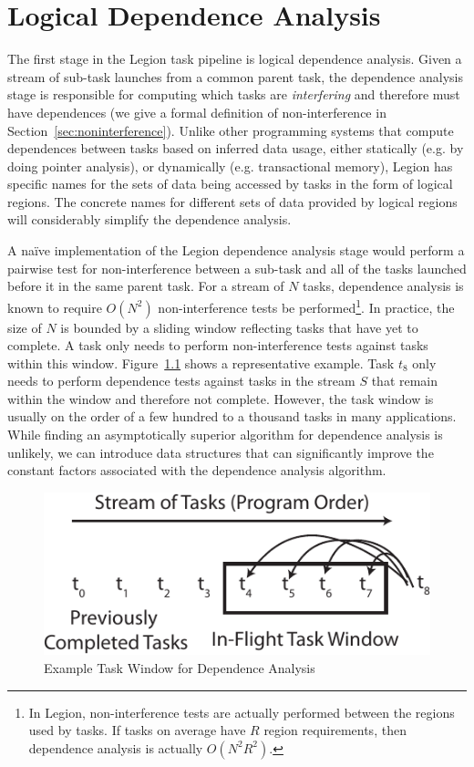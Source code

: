 

\chapter{Logical Dependence Analysis}
\label{chapter:logical}
The first stage in the Legion task pipeline
is logical dependence analysis. Given a stream
of sub-task launches from a common parent task, the 
dependence analysis stage is responsible for computing which 
tasks are {\em interfering} and therefore must have 
dependences (we give a formal definition of non-interference 
in Section~\ref{sec:noninterference}). Unlike other 
programming systems that compute dependences between 
tasks based on inferred data usage, either statically (e.g. 
by doing pointer analysis), or dynamically (e.g. transactional 
memory), Legion has specific names for the 
sets of data being accessed by tasks in the form 
of logical regions. The concrete names for different
sets of data provided by logical regions will
considerably simplify the dependence analysis.

A na\"{i}ve implementation of the Legion dependence 
analysis stage would perform a pairwise test for
non-interference between a sub-task and all of the
tasks launched before it in the same parent task.
For a stream of $N$ tasks, dependence analysis is 
known to require $O(N^2)$ non-interference tests
be performed\footnote{In Legion, non-interference
tests are actually performed between the regions
used by tasks. If tasks on average have $R$ region
requirements, then dependence analysis is actually
$O(N^2R^2)$.}. In practice, the size of $N$ is 
bounded by a sliding window reflecting tasks that
have yet to complete. A task only needs to perform
non-interference tests against tasks within this
window. Figure~\ref{fig:taskwindow} shows a 
representative example. Task $t_8$ only needs to
perform dependence tests against tasks in the
stream $S$ that remain within the window and 
therefore not complete. However, the 
task window is usually on the order of a few hundred 
to a thousand tasks in many applications. While 
finding an asymptotically superior algorithm for dependence 
analysis is unlikely, we can introduce data structures 
that can significantly improve the constant factors 
associated with the dependence analysis algorithm.

\begin{figure}[t]
\centering
\includegraphics[scale=0.7]{figs/TaskWindow.pdf}
\caption{Example Task Window for Dependence Analysis\label{fig:taskwindow}}
\end{figure}

